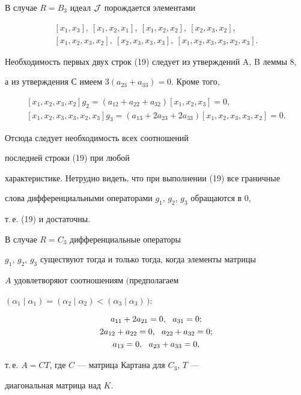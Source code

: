 \begin{pf}


В случае $R=B_3$ идеал $\cal J$ порождается элементами


\begin{gather*}


[x_1,x_3],\ [x_1,x_2,x_1],\ [x_1,x_2,x_2],\ [x_2,x_3,x_2],\\


[x_1,x_2,x_3,x_2],\ [x_2,x_3,x_3,x_3],\ [x_1,x_2,x_3,x_3,x_2,x_3].


\end{gather*}


Необходимость первых двух строк (19) следует из утверждений A, B леммы 8,


а из утверждения С имеем $3(a_{23}+a_{33})=0$. Кроме того,


\begin{gather*}


[x_1,x_2,x_3,x_2]g_2=(a_{12}+a_{22}+a_{32})[x_1,x_2,x_3]=0, \\


{[x_1,x_2,x_3,x_3,x_2,x_3]}g_3=


(a_{13}+2a_{23}+2a_{33})[x_1,x_2,x_3,x_3,x_2]=0.


\end{gather*}


Отсюда следует необходимость всех соотношений 


последней строки (19) при любой


характеристике. Нетрудно видеть, что при выполнении (19) все граничные


слова дифференциальными операторами $g_1$, $g_2$, $g_3$ обращаются в 0,


т.\,е. (19) и достаточны.


\end{pf}





\begin{lem}


В случае $R=C_3$ дифференциальные операторы


$g_1$, $g_2$, $g_3$ существуют тогда и только тогда, когда элементы матрицы


$A$ удовлетворяют соотношениям $($предполагаем


$(\alpha_1\mid\alpha_1)=(\alpha_2\mid\alpha_2)<(\alpha_3\mid\alpha_3)\,){:}$


\begin{gather}


a_{11}+2a_{21}=0,\ \  a_{31}=0;\notag \\


2a_{12}+a_{22}=0,\ \ a_{22}+a_{32}=0 ; \\


a_{13}=0,\ \ a_{23}+a_{33}=0, \notag


\end{gather}


т.\,е. $A=CT$, где $C$ --- матрица Картана для $C_3$, $T$ ---


диагональная матрица над $K$.


\end{lem}





